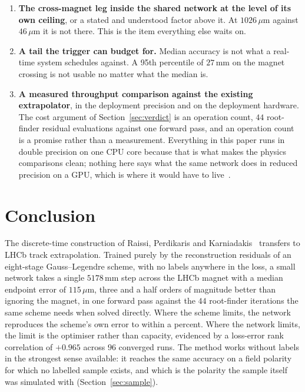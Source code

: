 \documentclass[11pt,a4paper]{article}
\newcommand{\um}{\ensuremath{\,\mu\mathrm{m}}}
\newcommand{\mm}{\ensuremath{\,\mathrm{mm}}}
\begin{document}
\begin{enumerate}
  \item \textbf{The cross-magnet leg inside the shared network at the level of
  its own ceiling}, or a stated and understood factor above it. At $1026\um$
  against $46\um$ it is not there. This is the item everything else waits on.
  \item \textbf{A tail the trigger can budget for.} Median accuracy is not what
  a real-time system schedules against. A 95th percentile of $27\mm$ on the
  magnet crossing is not usable no matter what the median is.
  \item \textbf{A measured throughput comparison against the existing
  extrapolator}, in the deployment precision and on the deployment hardware. The
  cost argument of Section~\ref{sec:verdict} is an operation count, $44$
  root-finder residual evaluations against one forward pass, and an operation
  count is a promise rather than a measurement. Everything in this paper runs in
  double precision on one CPU core because that is what makes the physics
  comparisons clean; nothing here says what the same network does in reduced
  precision on a GPU, which is where it would have to live~\cite{aaij2020}.
\end{enumerate}

\section{Conclusion}

The discrete-time construction of Raissi, Perdikaris and
Karniadakis~\cite{raissi2019} transfers to LHCb track extrapolation. Trained
purely by the reconstruction residuals of an eight-stage Gauss--Legendre scheme,
with no labels anywhere in the loss, a small network takes a single $5178\mm$
step across the LHCb magnet with a median endpoint error of $115\um$, three and
a half orders of magnitude better than ignoring the magnet, in one forward pass
against the $44$ root-finder iterations the same scheme needs when solved
directly. Where the scheme limits, the network reproduces the scheme's own error
to within a percent. Where the network limits, the limit is the optimiser rather
than capacity, evidenced by a loss-error rank correlation of $+0.965$ across
$96$ converged runs. The method works without labels in the strongest sense
available: it reaches the same accuracy on a field polarity for which no
labelled sample exists, and which is the polarity the sample itself was
simulated with (Section~\ref{sec:sample}).
\end{document}
